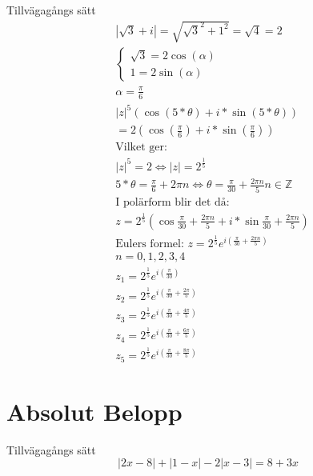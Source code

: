 \begin{multicols}{2}
\begin{exampleblock}{Tillvägagångs sätt}
\begin{align*}
  &|\sqrt{3} + i| = \sqrt{\sqrt{3}^2 + 1^2} = \sqrt{4} = 2 \\
  &\left\{ \begin{array} { l } { \sqrt{3} = 2 \cos(\alpha)} \\ { 1 = 2 \sin(\alpha) } \end{array} \right. \\
  &\alpha = \frac{\pi}{6} \\
  &|z|^5(\cos{(5*\theta)} + i * \sin{(5*\theta)}) \\
  &= 2(\cos{(\frac{\pi}{6})} + i * \sin{(\frac{\pi}{6})}) \\
  &\text{Vilket ger: } \\
  &|z|^5 = 2 \Leftrightarrow |z| = 2^{\frac{1}{5}} \\
  &5*\theta = \frac{\pi}{6} + 2 \pi n \Leftrightarrow \theta = \frac{\pi}{30} + \frac{2 \pi n}{5} n \in \mathbb{Z} \\
  &\text{I polärform blir det då: } \\
  &z = 2^{\frac{1}{5}} (\cos{\frac{\pi}{30} + \frac{2 \pi n}{5}} + i * \sin{\frac{\pi}{30} + \frac{2 \pi n}{5}}) \\
  &\text{Eulers formel: } z = 2^{\frac{1}{5}} e^{i (\frac{\pi}{30} + \frac{2 \pi n}{5})} \\
  &n = 0,1,2,3,4 \\
  &z_1 = 2^{\frac{1}{5}} e^{i (\frac{\pi}{30})} \\
  &z_2 = 2^{\frac{1}{5}} e^{i (\frac{\pi}{30} + \frac{2 \pi}{5})} \\
  &z_3 = 2^{\frac{1}{5}} e^{i (\frac{\pi}{30} + \frac{4 \pi}{5})} \\
  &z_4 = 2^{\frac{1}{5}} e^{i (\frac{\pi}{30} + \frac{6 \pi}{5})} \\
  &z_5 = 2^{\frac{1}{5}} e^{i (\frac{\pi}{30} + \frac{8 \pi}{5})}
\end{align*}
\end{exampleblock}


\section{Absolut Belopp}
\begin{exampleblock}{Tillvägagångs sätt}
\begin{equation*}
| 2 x - 8 | + | 1 - x | - 2 | x - 3 | = 8 + 3 x
\end{equation*}


\end{exampleblock}
\end{multicols}
